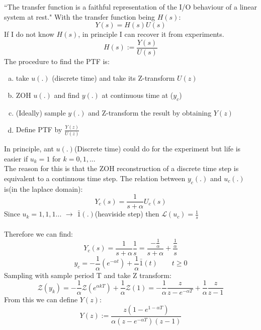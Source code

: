 \documentclass[a4paper,11pt]{article}
\begin{document}
	``The transfer function is a faithful representation of the I/O behaviour of a linear system at rest."
	With the transfer function being $H(s)$: 
	\begin{equation}
		Y(s)=H(s)U(s)
	\end{equation}
	If I do not know $H(s)$, in principle I can recover it from experiments.
	\begin{equation}
		H(s):=\frac{Y(s)}{U(s)}
	\end{equation}
	The procedure to find the PTF is:
	\begin{enumerate}[a)]
		\item take $u(.)$ (discrete time) and take its Z-transform $U(z)$
		\item ZOH $u(.)$ and find $y(.)$ at continuous time at ($y_c$) 
		\item (Ideally) sample $y(.)$ and Z-transform the result by obtaining $Y(z)$
		\item Define PTF by $\frac{Y(z)}{U(z)}$
	\end{enumerate}
	In principle, ant $u(.)$(Discrete time) could do for the experiment but life is easier if $u_k=1$ for $k=0,1,...$\\
	The reason for this is that the ZOH reconstruction of a discrete time step is equivalent to a continuous time step.
	The relation between $y_c(.)$ and $u_c(.)$ is(in the laplace domain):
	\begin{equation}
		Y_c(s)=\frac{1}{s+\alpha}U_c(s)
	\end{equation}  
	Since ${u_k}={1,1,1...}$ $\rightarrow$ $\bar1(.)$(heaviside step) then $\mathcal{L}(u_c)=\frac{1}{s}$\\\\
	Therefore we can find:
	\begin{equation}
		Y_c(s)=\frac{1}{s+\alpha}\frac{1}{s}=\frac{-\frac{1}{\alpha}}		{s+\alpha}+\frac{\frac{1}{\alpha}}{s}
	\end{equation}
	\begin{equation}
		y_c = -\frac{1}{\alpha}(e^{-\alpha t})+\frac{1}{\alpha}\bar1(t) \qquad t\geq 0
	\end{equation}
	Sampling with sample period T and take Z transform:
	\begin{equation}
		\mathcal{Z}(y_k)=-\frac{1}{\alpha}\mathcal{Z}(e^{\alpha kT})+\frac{1}{\alpha}\mathcal{Z}(1)=-\frac{1}{\alpha}\frac{z}{z-e^{-\alpha T}}+\frac{1}{\alpha}\frac{z}{z-1}
	\end{equation}
	From this we can define $Y(z)$:
	\begin{equation}
		Y(z) := \frac{z(1-e^{1-\alpha T})}{\alpha (z-e^{-\alpha T})(z-1)}
	\end{equation}			
\end{document}
